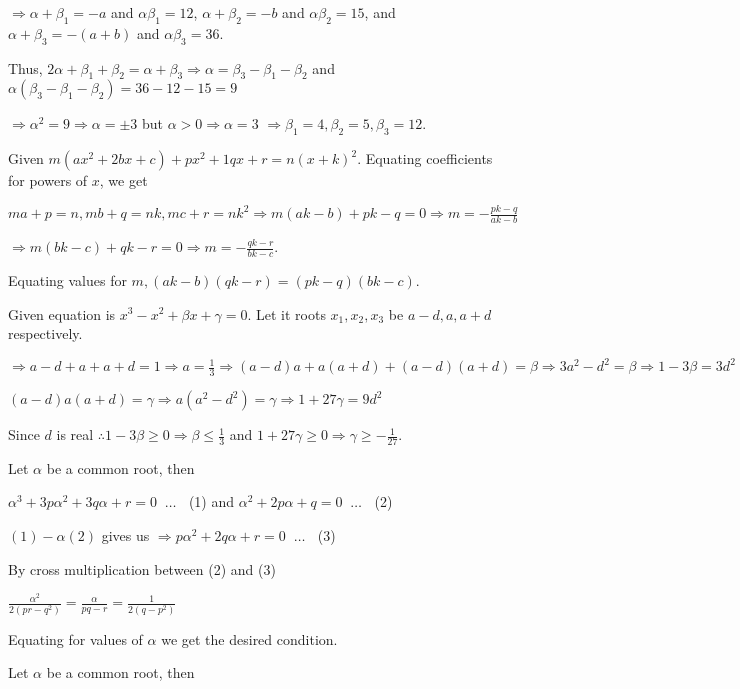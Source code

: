   $\Rightarrow \alpha + \beta_1 = -a$ and $\alpha\beta_1 = 12$, $\alpha + \beta_2 = -b$ and $\alpha\beta_2 =
  15$, and $\alpha + \beta_3 = -(a + b)$ and $\alpha\beta_3 = 36$.

  Thus, $2\alpha + \beta_1 + \beta_2 = \alpha + \beta_3 \Rightarrow \alpha = \beta_3 - \beta_1 - \beta_2$
  and $\alpha(\beta_3 - \beta_1 - \beta_2) = 36 - 12 - 15 = 9$

  $\Rightarrow \alpha^2 = 9 \Rightarrow \alpha = \pm 3$ but $\alpha > 0 \Rightarrow \alpha = 3$
  $\Rightarrow \beta_1 = 4, \beta_2 = 5, \beta_3 = 12$.
\item Given $m(ax^2 + 2bx + c) + px^2 + 1qx + r = n(x + k)^2$. Equating coefficients for powers of $x$, we get

  $ma + p = n, mb + q = nk, mc + r = nk^2\Rightarrow m(ak - b) + pk - q = 0 \Rightarrow m = -\frac{pk - q}{ak - b}$

  $\Rightarrow m(bk - c) + qk - r = 0 \Rightarrow m = -\frac{qk - r}{bk - c}$.

  Equating values for $m, (ak - b)(qk - r) = (pk - q)(bk - c)$.
\item Given equation is $x^3 - x^2 + \beta x + \gamma = 0$. Let it roots $x_1, x_2, x_3$ be $a - d, a, a +
  d$ respectively.

  $\Rightarrow a - d + a + a + d = 1 \Rightarrow a = \frac{1}{3}\Rightarrow (a - d)a + a(a + d) + (a - d)(a +
    d) = \beta \Rightarrow 3a^2 - d^2 = \beta \Rightarrow 1 - 3\beta = 3d^2$

  $(a - d)a(a + d) = \gamma \Rightarrow a(a^2 - d^2) = \gamma \Rightarrow 1 + 27\gamma = 9d^2$

  Since $d$ is real $\therefore 1 - 3\beta \ge 0 \Rightarrow \beta \le \frac{1}{3}$ and $1 + 27\gamma \ge 0
  \Rightarrow \gamma \ge -\frac{1}{27}$.
\item Let $\alpha$ be a common root, then

  $\alpha^3 + 3p\alpha^2 + 3q\alpha + r = 0\;\;\ldots\;\;$  (1) and $\alpha^2 + 2p\alpha + q = 0\;\;\ldots\;\;$ (2)

  $(1) - \alpha (2)$ gives us $\Rightarrow p\alpha^2 + 2q\alpha + r = 0\;\;\ldots\;\;$ (3)

  By cross multiplication between (2) and (3)

  $\frac{\alpha^2}{2(pr - q^2)} = \frac{\alpha}{pq - r} = \frac{1}{2(q - p^2)}$

  Equating for values of $\alpha$ we get the desired condition.
\item Let $\alpha$ be a common root, then

